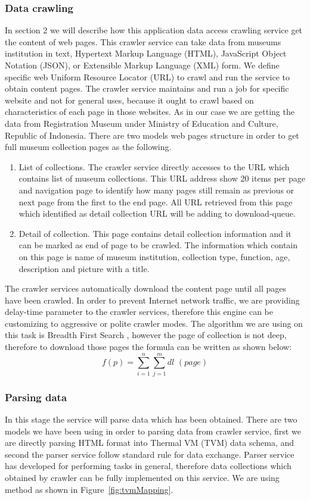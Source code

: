 \subsubsection{Data crawling}  In section 2 we will describe how this application data access crawling service get the content of web pages. This crawler service can take data from museums institution in text, Hypertext Markup Language (HTML), JavaScript Object Notation (JSON), or Extensible Markup Language (XML) form. We define specific web Uniform Resource Locator (URL) to crawl and run the service to obtain content pages. The crawler service maintains and run a job for specific website and not for general uses, because it ought to crawl based on characteristics of each page in those websites. As in our case we are getting the data from Registration Museum under Ministry of Education and Culture, Republic of Indonesia. There are two models web pages structure in order to get full museum collection pages as the following.

\begin{enumerate}
	\item List of collections. The crawler service directly accesses to the URL which contains list of museum collections. This URL address show 20 items per page and navigation page to identify how many pages still remain as previous or next page from the first to the end page. All URL retrieved from this page which identified as detail collection URL will be adding to download-queue.
	\item Detail of collection. This page contains detail collection information and it can be marked as end of page to be crawled. The information which contain on this page is name of museum institution, collection type, function, age, description and picture with a title.
\end{enumerate}

The crawler services automatically download the content page until all pages have been crawled. In order to prevent Internet network traffic, we are providing delay-time parameter to the crawler services, therefore this engine can be customizing to aggressive or polite crawler modes. The algorithm we are using on this task is Breadth First Search \cite{HassaanBurtscherPingali}, however the page of collection is not deep, therefore to download those pages the formula can be written as shown below:
\[
f(p) = \sum_{i = 1}^{n} \sum_{j = 1}^{m} \textit{dl }(\textit{page})
\]

\subsubsection{Parsing data} In this stage the service will parse data which has been obtained. There are two models we have been using in order to parsing data from crawler service, first we are directly parsing HTML format into Thermal VM (TVM) data schema, and second the parser service follow standard rule for data exchange. Parser service has developed for performing tasks in general, therefore data collections which obtained by crawler can be fully implemented on this service. We are using method as shown in Figure~\cref{fig:tvmMapping}.

